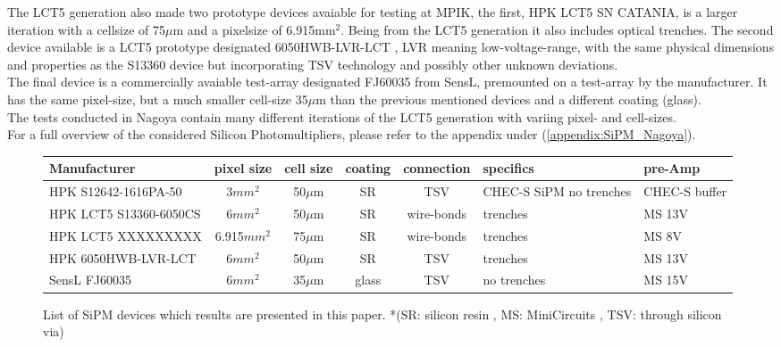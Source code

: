 \documentclass[12pt,article,type=msc,colorback,accentcolor=tud9c]{tudthesis}
\begin{document}
The LCT5 generation also made two prototype devices avaiable for testing at MPIK, the first, HPK LCT5 SN CATANIA, is a larger iteration with a cellsize of 75$\mu$m and a pixelsize of 6.915mm$^2$. Being from the LCT5 generation it also includes optical trenches. The second device available is a LCT5 prototype designated 6050HWB-LVR-LCT , LVR meaning low-voltage-range, with the same physical dimensions and properties as the S13360 device but incorporating TSV technology and possibly other unknown deviations.\\
The final device is a commercially avaiable test-array designated FJ60035 from SensL, premounted on a test-array by the manufacturer. It has the same pixel-size, but a much smaller cell-size 35$\mu$m than the previous mentioned devices and a different coating (glass).\\

The tests conducted in Nagoya contain many different iterations of the LCT5 generation with variing pixel- and cell-sizes.\\
For a full overview of the considered Silicon Photomultipliers, please refer to the appendix under (\ref{appendix:SiPM_Nagoya}).

\begin{figure}[h]
\begin{tabular}{ |l | c | c | c | c | p{1.5cm} | p{1.5cm} |}
    \hline
    Manufacturer                            & pixel size  & cell size & coating & connection & specifics               & pre-Amp       \\ \hline
    HPK S12642-1616PA-50                    & 3$mm^2$     & 50$\mu$m  & SR      & TSV        & CHEC-S SiPM no trenches & CHEC-S buffer \\ \hline
    HPK LCT5 S13360-6050CS                  & 6$mm^2$     & 50$\mu$m  & SR      & wire-bonds & trenches                & MS 13V        \\ \hline
    HPK LCT5 XXXXXXXXX                      & 6.915$mm^2$ & 75$\mu$m  & SR      & wire-bonds & trenches                & MS 8V         \\ \hline
    HPK 6050HWB-LVR-LCT                     & 6$mm^2$     & 50$\mu$m  & SR      & TSV        & trenches                & MS 13V        \\ \hline
    SensL FJ60035                           & 6$mm^2$     & 35$\mu$m  & glass   & TSV        & no trenches             & MS 15V        \\
    \hline
\end{tabular}
\caption{List of SiPM devices which results are presented in this paper. *(SR: silicon resin , MS: MiniCircuits , TSV: through silicon via)}
\end{figure}
\end{document}
